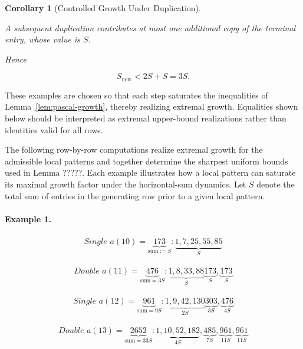 \documentclass[12pt, oneside]{article}
\numberwithin{equation}{section}
\theoremstyle{definition}
\theoremstyle{plain}
\newtheorem{corollary}[theorem]{Corollary}
\theoremstyle{remark}
\begin{document}
\begin{corollary}[Controlled Growth Under Duplication]
\label{lem:controlled-growth-under-duplication}

A subsequent duplication contributes at most one additional copy of the
terminal entry, whose value is $S$.

Hence

\[
S_{\mathrm{new}}
<
2S+S
=
3S.
\]

\end{corollary}

These examples are chosen so that each step saturates the inequalities of
Lemma~\ref{lem:pascal-growth}, thereby realizing extremal growth. Equalities
shown below should be interpreted as extremal upper-bound realizations rather than
identities valid for all rows.

The following row-by-row computations realize extremal growth for the admissible
local patterns and together determine the sharpest uniform bounds used in
Lemma ?????.  Each example illustrates how a local pattern
can saturate its maximal growth factor under the horizontal-sum dynamics.  Let $S$
denote the total sum of entries in the generating row prior to a given local pattern.

\paragraph{Example 1.}
\[
\begin{array}{l}
\textit{Single } a(10) = \underbrace{173}_{\text{sum} := S}:
\underbrace{1,7,25,55,85}_{S}
\end{array}
\]

\[
\begin{array}{l}
\textit{Double } a(11) = \underbrace{476}_{\text{sum} = 3S}:
\underbrace{1,8,33,88}_{S}
\underbrace{173}_{S},
\underbrace{173}_{S}
\end{array}
\]

\[
\begin{array}{l}
\textit{Single } a(12) = \underbrace{961}_{\text{sum} = 9S}:
\underbrace{1,9,42,130}_{2S}
\underbrace{303}_{3S},
\underbrace{476}_{4S}
\end{array}
\]

\[
\begin{array}{l}
\textit{Double } a(13) = \underbrace{2652}_{\text{sum} = 33S}:
\underbrace{1,10,52,182}_{4S},
\underbrace{485}_{7S},
\underbrace{961}_{11S},
\underbrace{961}_{11S}
\end{array}
\]
\end{document}
